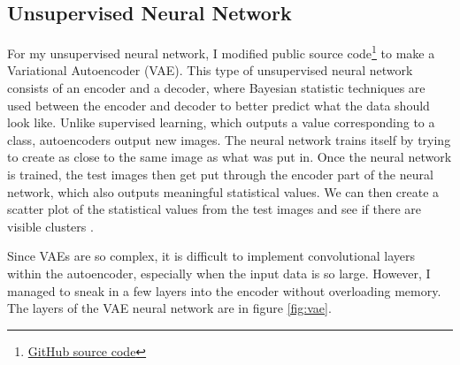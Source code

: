\documentclass[a4paper]{article}
\begin{document}
\subsection{Unsupervised Neural Network}

For my unsupervised neural network, I modified public source code\footnote{\href{https://github.com/keras-team/keras/blob/master/examples/variational_autoencoder.py}{GitHub source code}} to make a Variational Autoencoder (VAE). This type of unsupervised neural network consists of an encoder and a decoder, where Bayesian statistic techniques are used between the encoder and decoder to better predict what the data should look like. Unlike supervised learning, which outputs a value corresponding to a class, autoencoders output new images. The neural network trains itself by trying to create as close to the same image as what was put in. Once the neural network is trained, the test images then get put through the encoder part of the neural network, which also outputs meaningful statistical values. We can then create a scatter plot of the statistical values from the test images and see if there are visible clusters \cite{Kingma:2013}. 

Since VAEs are so complex, it is difficult to implement convolutional layers within the autoencoder, especially when the input data is so large. However, I managed to sneak in a few layers into the encoder without overloading memory. The layers of the VAE neural network are in figure \ref{fig:vae}.
\end{document}
